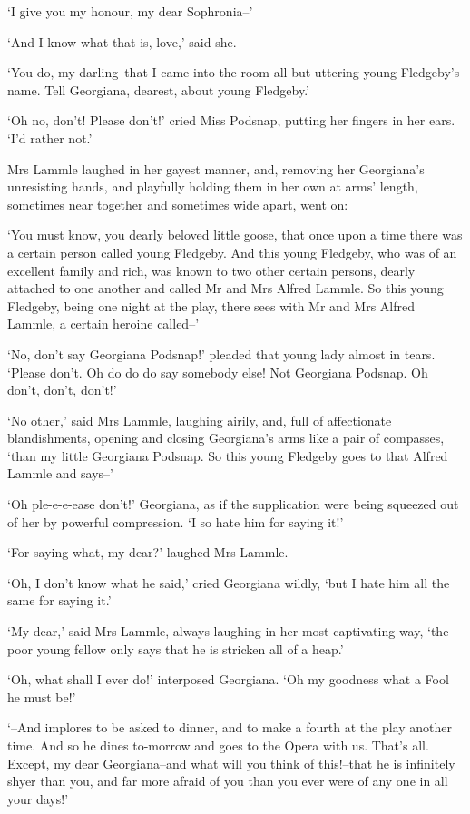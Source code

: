 ‘I give you my honour, my dear Sophronia--’

‘And I know what that is, love,’ said she.

‘You do, my darling--that I came into the room all but uttering young
Fledgeby’s name. Tell Georgiana, dearest, about young Fledgeby.’

‘Oh no, don’t! Please don’t!’ cried Miss Podsnap, putting her fingers in
her ears. ‘I’d rather not.’

Mrs Lammle laughed in her gayest manner, and, removing her Georgiana’s
unresisting hands, and playfully holding them in her own at arms’
length, sometimes near together and sometimes wide apart, went on:

‘You must know, you dearly beloved little goose, that once upon a
time there was a certain person called young Fledgeby. And this young
Fledgeby, who was of an excellent family and rich, was known to two
other certain persons, dearly attached to one another and called Mr and
Mrs Alfred Lammle. So this young Fledgeby, being one night at the play,
there sees with Mr and Mrs Alfred Lammle, a certain heroine called--’

‘No, don’t say Georgiana Podsnap!’ pleaded that young lady almost in
tears. ‘Please don’t. Oh do do do say somebody else! Not Georgiana
Podsnap. Oh don’t, don’t, don’t!’

‘No other,’ said Mrs Lammle, laughing airily, and, full of affectionate
blandishments, opening and closing Georgiana’s arms like a pair of
compasses, ‘than my little Georgiana Podsnap. So this young Fledgeby goes
to that Alfred Lammle and says--’

‘Oh ple-e-e-ease don’t!’ Georgiana, as if the supplication were being
squeezed out of her by powerful compression. ‘I so hate him for saying
it!’

‘For saying what, my dear?’ laughed Mrs Lammle.

‘Oh, I don’t know what he said,’ cried Georgiana wildly, ‘but I hate him
all the same for saying it.’

‘My dear,’ said Mrs Lammle, always laughing in her most captivating way,
‘the poor young fellow only says that he is stricken all of a heap.’

‘Oh, what shall I ever do!’ interposed Georgiana. ‘Oh my goodness what a
Fool he must be!’

‘--And implores to be asked to dinner, and to make a fourth at the play
another time. And so he dines to-morrow and goes to the Opera with
us. That’s all. Except, my dear Georgiana--and what will you think of
this!--that he is infinitely shyer than you, and far more afraid of you
than you ever were of any one in all your days!’

